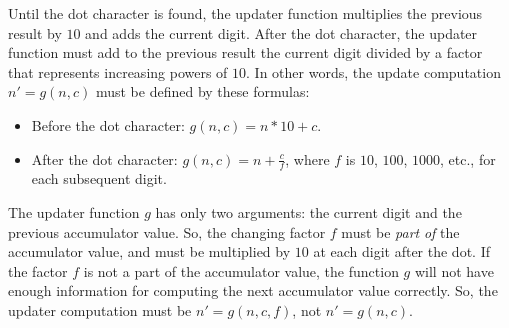Until the dot character is found, the updater function multiplies
the previous result by $10$ and adds the current digit. After the
dot character, the updater function must add to the previous result
the current digit divided by a factor that represents increasing powers
of $10$. In other words, the update computation $n'=g(n,c)$ must
be defined by these formulas:
\begin{itemize}
\item Before the dot character: $g(n,c)=n*10+c$.
\item After the dot character: $g(n,c)=n+\frac{c}{f}$, where $f$ is $10$,
$100$, $1000$, etc., for each subsequent digit.
\end{itemize}
The updater function $g$ has only two arguments: the current digit
and the previous accumulator value. So, the changing factor $f$ must
be \emph{part} \emph{of} the accumulator value, and must be multiplied
by $10$ at each digit after the dot. If the factor $f$ is not a
part of the accumulator value, the function $g$ will not have enough
information for computing the next accumulator value correctly. So,
the updater computation must be $n'=g(n,c,f)$, not $n'=g(n,c)$.

